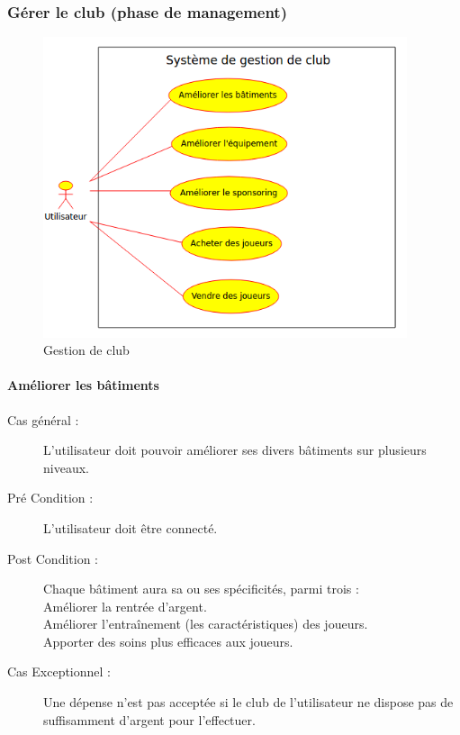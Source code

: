 \documentclass[a4paper]{article}
\begin{document}
\subsubsection{Gérer le \gls{club} (phase de management)}
\begin{figure}[h]
    \caption{\label{1} Gestion de \gls{club}}
   \begin{center}
   \includegraphics[height=250pt]{uml/mngClub.png}
   \end{center}
\end{figure}
\paragraph{Améliorer les bâtiments}
\begin{description}
\item[Cas général :] L'\gls{utilisateur} doit pouvoir améliorer ses divers bâtiments sur plusieurs niveaux. 
\item[Pré Condition  :] L'\gls{utilisateur} doit être connecté.
\item[Post Condition :] Chaque bâtiment aura sa ou ses spécificités, parmi trois :\\
Améliorer la rentrée d'argent.\\
Améliorer l'entraînement (les caractéristiques) des \glspl{joueur}.\\
Apporter des soins plus efficaces aux \glspl{joueur}.
\item[Cas Exceptionnel :] Une dépense n'est pas acceptée si le \gls{club} de l'\gls{utilisateur} ne dispose pas de suffisamment d'argent pour l'effectuer.
\end{description}
\end{document}
